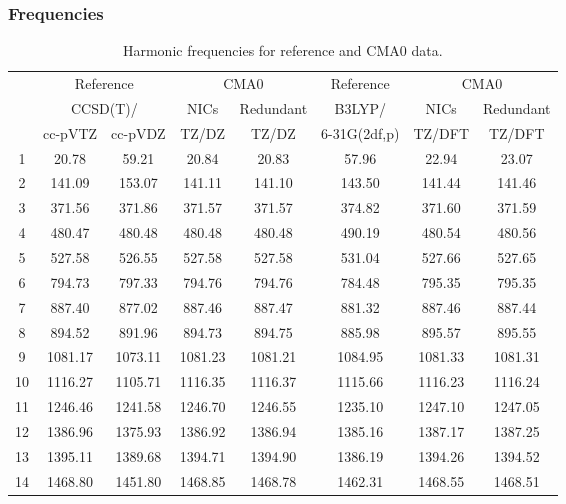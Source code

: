 \documentclass[10pt,oneside]{article}
\begin{document}
\begin{table}[h!]
\subsubsection*{Frequencies}
\centering
\caption{Harmonic frequencies for reference and CMA0 data.}
\begin{tabular}{cccccccc}
\toprule
{} & \multicolumn{2}{c}{Reference} & \multicolumn{2}{c}{CMA0} &    Reference & \multicolumn{2}{c}{CMA0} \\
{} & \multicolumn{2}{c}{CCSD(T)/} &    NICs &  Redundant &       B3LYP/ &    NICs & Redundant \\
{} &   cc-pVTZ & cc-pVDZ &   TZ/DZ &      TZ/DZ & 6-31G(2df,p) &  TZ/DFT &    TZ/DFT \\
\midrule
1  &     20.78 &   59.21 &   20.84 &      20.83 &        57.96 &   22.94 &     23.07 \\
2  &    141.09 &  153.07 &  141.11 &     141.10 &       143.50 &  141.44 &    141.46 \\
3  &    371.56 &  371.86 &  371.57 &     371.57 &       374.82 &  371.60 &    371.59 \\
4  &    480.47 &  480.48 &  480.48 &     480.48 &       490.19 &  480.54 &    480.56 \\
5  &    527.58 &  526.55 &  527.58 &     527.58 &       531.04 &  527.66 &    527.65 \\
6  &    794.73 &  797.33 &  794.76 &     794.76 &       784.48 &  795.35 &    795.35 \\
7  &    887.40 &  877.02 &  887.46 &     887.47 &       881.32 &  887.46 &    887.44 \\
8  &    894.52 &  891.96 &  894.73 &     894.75 &       885.98 &  895.57 &    895.55 \\
9  &   1081.17 & 1073.11 & 1081.23 &    1081.21 &      1084.95 & 1081.33 &   1081.31 \\
10 &   1116.27 & 1105.71 & 1116.35 &    1116.37 &      1115.66 & 1116.23 &   1116.24 \\
11 &   1246.46 & 1241.58 & 1246.70 &    1246.55 &      1235.10 & 1247.10 &   1247.05 \\
12 &   1386.96 & 1375.93 & 1386.92 &    1386.94 &      1385.16 & 1387.17 &   1387.25 \\
13 &   1395.11 & 1389.68 & 1394.71 &    1394.90 &      1386.19 & 1394.26 &   1394.52 \\
14 &   1468.80 & 1451.80 & 1468.85 &    1468.78 &      1462.31 & 1468.55 &   1468.51 \\

\end{tabular}
\end{table}
\end{document}
